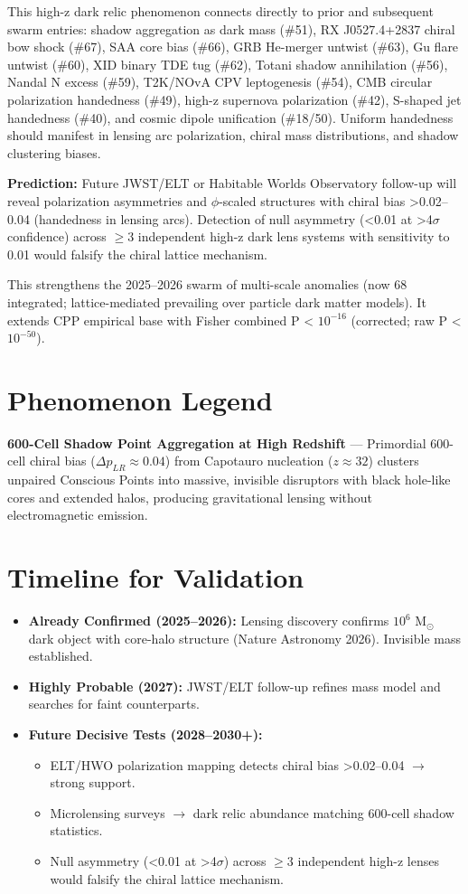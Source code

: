 \documentclass[11pt]{article}
\begin{document}
This high-z dark relic phenomenon connects directly to prior and subsequent swarm entries: shadow aggregation as dark mass (\#51), RX J0527.4+2837 chiral bow shock (\#67), SAA core bias (\#66), GRB He-merger untwist (\#63), Gu flare untwist (\#60), XID binary TDE tug (\#62), Totani shadow annihilation (\#56), Nandal N excess (\#59), T2K/NOvA CPV leptogenesis (\#54), CMB circular polarization handedness (\#49), high-z supernova polarization (\#42), S-shaped jet handedness (\#40), and cosmic dipole unification (\#18/50). Uniform handedness should manifest in lensing arc polarization, chiral mass distributions, and shadow clustering biases.

\textbf{Prediction:} Future JWST/ELT or Habitable Worlds Observatory follow-up will reveal polarization asymmetries and $\phi$-scaled structures with chiral bias >0.02--0.04 (handedness in lensing arcs). Detection of null asymmetry (<0.01 at >4$\sigma$ confidence) across $\geq 3$ independent high-z dark lens systems with sensitivity to 0.01 would falsify the chiral lattice mechanism.

This strengthens the 2025--2026 swarm of multi-scale anomalies (now 68 integrated; lattice-mediated prevailing over particle dark matter models). It extends CPP empirical base with Fisher combined P < $10^{-16}$ (corrected; raw P < $10^{-50}$).

\section{Phenomenon Legend}
\textbf{600-Cell Shadow Point Aggregation at High Redshift} — Primordial 600-cell chiral bias ($\Delta p_{LR} \approx 0.04$) from Capotauro nucleation ($z \approx 32$) clusters unpaired Conscious Points into massive, invisible disruptors with black hole-like cores and extended halos, producing gravitational lensing without electromagnetic emission.

\section{Timeline for Validation}
\begin{itemize}
    \item \textbf{Already Confirmed (2025--2026):} Lensing discovery confirms $10^6$ M$_\odot$ dark object with core-halo structure (Nature Astronomy 2026). Invisible mass established.
    \item \textbf{Highly Probable (2027):} JWST/ELT follow-up refines mass model and searches for faint counterparts.
    \item \textbf{Future Decisive Tests (2028--2030+):}
    \begin{itemize}
        \item ELT/HWO polarization mapping detects chiral bias >0.02--0.04 $\to$ strong support.
        \item Microlensing surveys $\to$ dark relic abundance matching 600-cell shadow statistics.
        \item Null asymmetry (<0.01 at >4$\sigma$) across $\geq 3$ independent high-z lenses would falsify the chiral lattice mechanism.
    \end{itemize}
\end{itemize}
\end{document}
